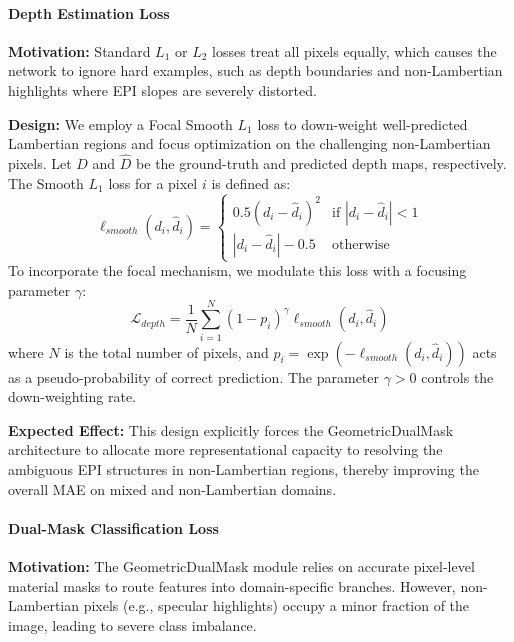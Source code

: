 \documentclass[lettersize,journal]{IEEEtran}
\begin{document}
\paragraph{Depth Estimation Loss}
\textbf{Motivation:} Standard $L_1$ or $L_2$ losses treat all pixels equally, which causes the network to ignore hard examples, such as depth boundaries and non-Lambertian highlights where EPI slopes are severely distorted. 

\textbf{Design:} We employ a Focal Smooth $L_1$ loss to down-weight well-predicted Lambertian regions and focus optimization on the challenging non-Lambertian pixels. Let $D$ and $\hat{D}$ be the ground-truth and predicted depth maps, respectively. The Smooth $L_1$ loss for a pixel $i$ is defined as:
\begin{equation} \label{eq:ch3_18}
\ell_{smooth}(d_i, \hat{d}_i) = \begin{cases} 0.5 (d_i - \hat{d}_i)^2 & \text{if } |d_i - \hat{d}_i| < 1 \\ |d_i - \hat{d}_i| - 0.5 & \text{otherwise} \end{cases}
\end{equation}
To incorporate the focal mechanism, we modulate this loss with a focusing parameter $\gamma$:
\begin{equation} \label{eq:ch3_19}
\mathcal{L}_{depth} = \frac{1}{N} \sum_{i=1}^{N} (1 - p_i)^\gamma \ell_{smooth}(d_i, \hat{d}_i)
\end{equation}
where $N$ is the total number of pixels, and $p_i = \exp(-\ell_{smooth}(d_i, \hat{d}_i))$ acts as a pseudo-probability of correct prediction. The parameter $\gamma > 0$ controls the down-weighting rate. 

\textbf{Expected Effect:} This design explicitly forces the GeometricDualMask architecture to allocate more representational capacity to resolving the ambiguous EPI structures in non-Lambertian regions, thereby improving the overall MAE on mixed and non-Lambertian domains.

\paragraph{Dual-Mask Classification Loss}
\textbf{Motivation:} The GeometricDualMask module relies on accurate pixel-level material masks to route features into domain-specific branches. However, non-Lambertian pixels (e.g., specular highlights) occupy a minor fraction of the image, leading to severe class imbalance.
\end{document}
